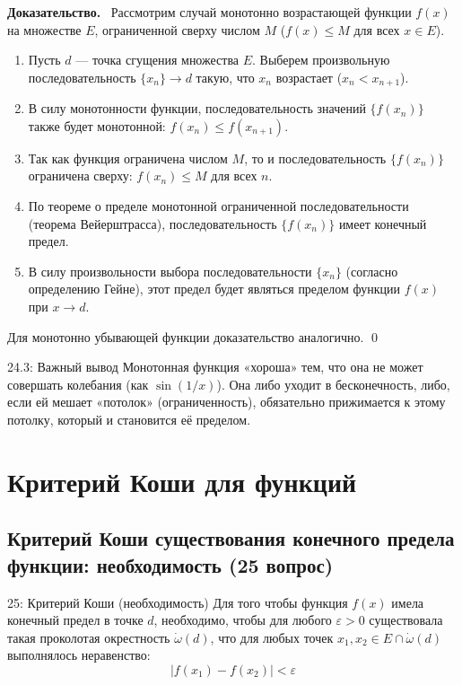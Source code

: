 \documentclass[a4paper,12pt]{article}
\newcommand{\myproof}{\textbf{Доказательство.}\ }
\begin{document}
	\vspace{0.5cm}
	\myproof
	Рассмотрим случай монотонно возрастающей функции $f(x)$ на множестве $E$, ограниченной сверху числом $M$ ($f(x) \le M$ для всех $x \in E$).
	
	\begin{enumerate}
		\item Пусть $d$ — точка сгущения множества $E$. Выберем произвольную последовательность $\{x_n\} \to d$ такую, что $x_n$ возрастает ($x_n < x_{n+1}$).
		\item В силу монотонности функции, последовательность значений $\{f(x_n)\}$ также будет монотонной: $f(x_n) \le f(x_{n+1})$.
		\item Так как функция ограничена числом $M$, то и последовательность $\{f(x_n)\}$ ограничена сверху: $f(x_n) \le M$ для всех $n$.
		\item По теореме о пределе монотонной ограниченной последовательности (теорема Вейерштрасса), последовательность $\{f(x_n)\}$ имеет конечный предел.
		\item В силу произвольности выбора последовательности $\{x_n\}$ (согласно определению Гейне), этот предел будет являться пределом функции $f(x)$ при $x \to d$.
	\end{enumerate}
	
	Для монотонно убывающей функции доказательство аналогично. \qed
	
	\begin{notebook}{24.3: Важный вывод}
		Монотонная функция «хороша» тем, что она не может совершать колебания (как $\sin(1/x)$). Она либо уходит в бесконечность, либо, если ей мешает «потолок» (ограниченность), обязательно прижимается к этому потолку, который и становится её пределом.
	\end{notebook}
	
	
	
	
	
	
	\newpage
	\section{Критерий Коши для функций}
	
	\subsection{Критерий Коши существования конечного предела функции: необходимость (25 вопрос)}
	
	\begin{theorembox}{25: Критерий Коши (необходимость)}
		Для того чтобы функция $f(x)$ имела конечный предел в точке $d$, необходимо, чтобы для любого $\varepsilon > 0$ существовала такая проколотая окрестность $\dot{\omega}(d)$, что для любых точек $x_1, x_2 \in E \cap \dot{\omega}(d)$ выполнялось неравенство:
		\[ |f(x_1) - f(x_2)| < \varepsilon \]
	\end{theorembox}
	
\end{document}
